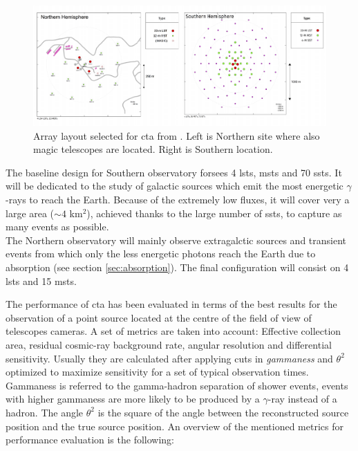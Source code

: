 \documentclass[main.tex]{subfiles}
\begin{document}
\begin{figure}
\centering
 \includegraphics[width=1\textwidth]{Pictures/Array-Layouts.pdf}
  \caption{Array layout selected for \gls{cta} from \cite{CTAPerformance}. Left is Northern site where also \gls{magic} telescopes are located. Right is Southern location.}
    \label{fig:arraylayout}
\end{figure}

The baseline design for Southern observatory forsees 4 \glspl{lst}, \glspl{mst} and 70 \glspl{sst}. It will be dedicated to the study of galactic sources which emit the most energetic $\gamma$-rays to reach the Earth. Because of the extremely low fluxes, it will cover very a large area ($\sim4$ km$^2$), achieved thanks to the large number of \glspl{sst}, to capture as many events as possible.\\
The Northern observatory will mainly observe extragalctic sources and transient events from which only the less energetic photons reach the Earth due to absorption (see section \ref{sec:absorption}). The final configuration will consist on 4 \glspl{lst} and 15 \glspl{mst}.

The performance of \gls{cta} has been evaluated in terms of the best results for the observation of a point source located at the centre of the field of view of telescopes cameras. A set of metrics are taken into account: Effective collection area, residual cosmic-ray background rate, angular resolution and differential sensitivity. Usually they are calculated after applying cuts in \textit{gammaness} and $\theta^2$ optimized to maximize sensitivity for a set of typical observation times. Gammaness is referred to the gamma-hadron separation of shower events, events with higher gammaness are more likely to be produced by a $\gamma$-ray instead of a hadron. The angle $\theta^2$ is the square of the angle between the reconstructed source position and the true source position.
An overview of the mentioned metrics for performance evaluation is the following:\\
\end{document}
